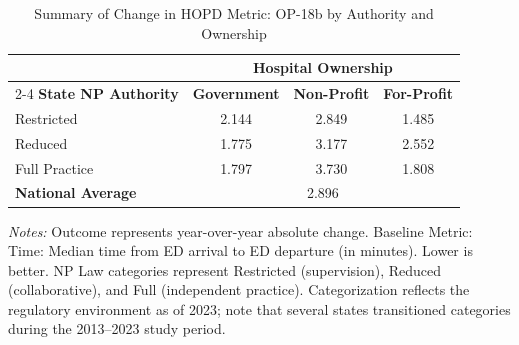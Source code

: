 \begin{table}[htbp]
    \centering
    \caption{Summary of Change in HOPD Metric: OP-18b by Authority and Ownership}
    \label{tab:d_hopd_op_18b}
    \vspace{0.2cm}
    \begin{tabular}{lccc}
        \toprule
        & \multicolumn{3}{c}{\textbf{Hospital Ownership}} \\
        \cmidrule(lr){2-4}
        \textbf{State NP Authority} & \textbf{Government} & \textbf{Non-Profit} & \textbf{For-Profit} \\
        \midrule
        Restricted & 2.144 & 2.849 & 1.485 \\
        Reduced & 1.775 & 3.177 & 2.552 \\
        Full Practice & 1.797 & 3.730 & 1.808 \\
        \midrule
        \textbf{National Average} & \multicolumn{3}{c}{2.896} \\
        \bottomrule
    \end{tabular}
    \vspace{0.1cm}
    \begin{minipage}{0.85\textwidth}
        \footnotesize \textit{Notes:} Outcome represents year-over-year absolute change. Baseline Metric: Time: Median time from ED arrival to ED departure (in minutes). Lower is better. NP Law categories represent Restricted (supervision), Reduced (collaborative), and Full (independent practice). Categorization reflects the regulatory environment as of 2023; note that several states transitioned categories during the 2013--2023 study period.
    \end{minipage}
\end{table}